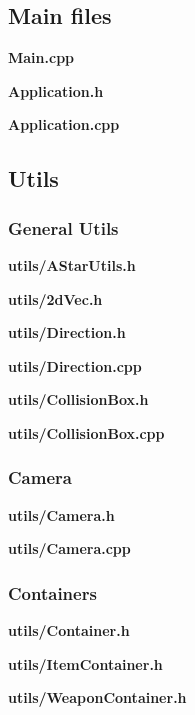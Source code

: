 \documentclass[../Main.tex]{subfiles}
\begin{document}
    \subsection{Main files}
        \textbf{Main.cpp}
        
        \textbf{Application.h}
        
        \textbf{Application.cpp}
        
    \subsection{Utils}
        \subsubsection{General Utils}
            \textbf{utils/AStarUtils.h}
            

            \textbf{utils/2dVec.h}
            

            \textbf{utils/Direction.h}
            
            \textbf{utils/Direction.cpp}
            

            \textbf{utils/CollisionBox.h}
            
            \textbf{utils/CollisionBox.cpp}
            


        \subsubsection{Camera}
            \textbf{utils/Camera.h}
            
            \textbf{utils/Camera.cpp}
            

        \subsubsection{Containers}
            \textbf{utils/Container.h}
            
            \textbf{utils/ItemContainer.h}
            
            \textbf{utils/WeaponContainer.h}
            
\end{document}
